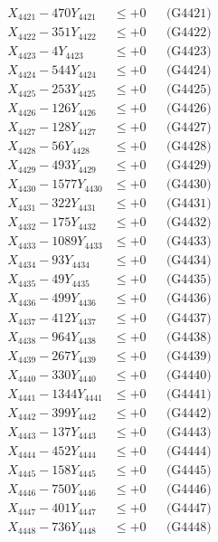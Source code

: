 \documentclass[a4paper,10pt]{article}
\begin{document}
{\begin{align}
\allowbreak
X_{4421} - 470Y_{4421} &\leq +0 && \text{(G4421)} \\
X_{4422} - 351Y_{4422} &\leq +0 && \text{(G4422)} \\
X_{4423} - 4Y_{4423} &\leq +0 && \text{(G4423)} \\
X_{4424} - 544Y_{4424} &\leq +0 && \text{(G4424)} \\
X_{4425} - 253Y_{4425} &\leq +0 && \text{(G4425)} \\
X_{4426} - 126Y_{4426} &\leq +0 && \text{(G4426)} \\
X_{4427} - 128Y_{4427} &\leq +0 && \text{(G4427)} \\
X_{4428} - 56Y_{4428} &\leq +0 && \text{(G4428)} \\
X_{4429} - 493Y_{4429} &\leq +0 && \text{(G4429)} \\
X_{4430} - 1577Y_{4430} &\leq +0 && \text{(G4430)} \\
\allowbreak
X_{4431} - 322Y_{4431} &\leq +0 && \text{(G4431)} \\
X_{4432} - 175Y_{4432} &\leq +0 && \text{(G4432)} \\
X_{4433} - 1089Y_{4433} &\leq +0 && \text{(G4433)} \\
X_{4434} - 93Y_{4434} &\leq +0 && \text{(G4434)} \\
X_{4435} - 49Y_{4435} &\leq +0 && \text{(G4435)} \\
X_{4436} - 499Y_{4436} &\leq +0 && \text{(G4436)} \\
X_{4437} - 412Y_{4437} &\leq +0 && \text{(G4437)} \\
X_{4438} - 964Y_{4438} &\leq +0 && \text{(G4438)} \\
X_{4439} - 267Y_{4439} &\leq +0 && \text{(G4439)} \\
X_{4440} - 330Y_{4440} &\leq +0 && \text{(G4440)} \\
\allowbreak
X_{4441} - 1344Y_{4441} &\leq +0 && \text{(G4441)} \\
X_{4442} - 399Y_{4442} &\leq +0 && \text{(G4442)} \\
X_{4443} - 137Y_{4443} &\leq +0 && \text{(G4443)} \\
X_{4444} - 452Y_{4444} &\leq +0 && \text{(G4444)} \\
X_{4445} - 158Y_{4445} &\leq +0 && \text{(G4445)} \\
X_{4446} - 750Y_{4446} &\leq +0 && \text{(G4446)} \\
X_{4447} - 401Y_{4447} &\leq +0 && \text{(G4447)} \\
X_{4448} - 736Y_{4448} &\leq +0 && \text{(G4448)} \\

\end{align}}
\end{document}
